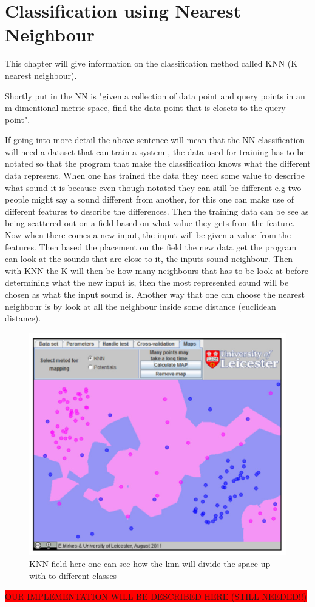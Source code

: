 \section{Classification using Nearest Neighbour}
This chapter will give information on the classification method called KNN (K nearest neighbour).

Shortly put in \citep{meaningfulNN} the NN is "given a collection of data point and query points in an m-dimentional metric space, find the data point that is closets to the query point".

If going into more detail the above sentence will mean that the NN classification will need a dataset that can train a system \citep{Sinoyr05}, the data used for training has to be notated so that the program that make the classification knows what the different data represent. When one has trained the data they need some value to describe what sound it is  because even though notated they can still be different e.g two people might say a sound different from another, for this one can make use of different features to describe the differences. Then the training data can be see as being scattered out on a field based on what value they gets from the feature. Now when there comes a new input, the input will be given a value from the features. Then based the placement on the field the new data get the program can look at the sounds that are close to it, the inputs sound neighbour. Then with KNN the K will then be how many neighbours that has to be look at before determining what the new input is, then the most represented sound will be chosen as what the input sound is\citep{introKNN}. Another way that one can choose the nearest neighbour is by look at all the neighbour inside some distance (euclidean distance)\citep{NNHD}.

\begin{figure}[h]
	\begin{center}
		\includegraphics[scale = 0.5]{fig/KNNfig.jpg}
		\caption{KNN field here one can see how the knn will divide the space up with to different classes \citep{introKNN}}
		\label{KNN fig}
	\end{center}
\end{figure}

\colorbox{red}{OUR IMPLEMENTATION WILL BE DESCRIBED HERE (STILL NEEDED!!)}